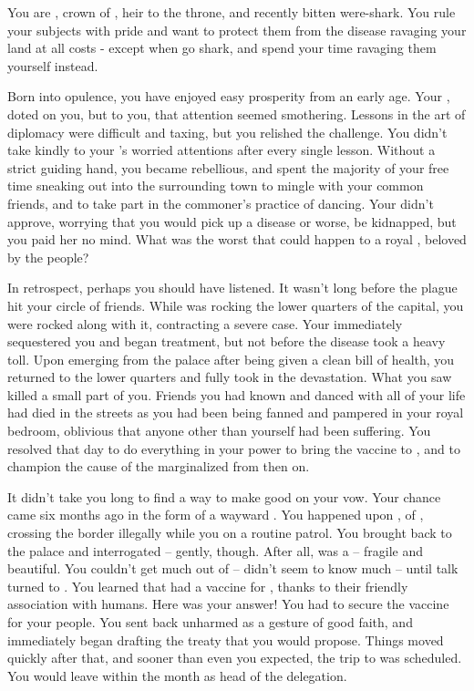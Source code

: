 \documentclass[char]{NeptuneBall}
\begin{document}
\name{\cPrince{}}

You are \cPrince{}, crown \cPrince{\prince} of \pPacifica{}, heir to the throne, and recently bitten were-shark. You rule your subjects with pride and want to protect them from the disease ravaging your land at all costs - except when go shark, and spend your time ravaging them yourself instead.

Born into opulence, you have enjoyed easy prosperity from an early age. Your \cPacificanRuler{\parent}, \cPacificanRuler{\King} \cPacificanRuler{} doted on you, but to you, that attention seemed smothering. Lessons in the art of diplomacy were difficult and taxing, but you relished the challenge. You didn't take kindly to your \cPacificanRuler{\parent}'s worried attentions after every single lesson. Without a strict guiding hand, you became rebellious, and spent the majority of your free time sneaking out into the surrounding town to mingle with your common friends, and to take part in the commoner's practice of dancing. Your \cPacificanRuler{\parent} didn't approve, worrying that you would pick up a disease or worse, be kidnapped, but you paid her no mind. What was the worst that could happen to a royal \cPrince{\prince}, beloved by the people?

In retrospect, perhaps you should have listened. It wasn't long before the plague hit your circle of friends. While \ppolio{} was rocking the lower quarters of the capital, you were rocked along with it, contracting a severe case. Your \cPacificanRuler{\parent} immediately sequestered you and began treatment, but not before the disease took a heavy toll. Upon emerging from the palace after being given a clean bill of health, you returned to the lower quarters and fully took in the devastation. What you saw killed a small part of you. Friends you had known and danced with all of your life had died in the streets as you had been being fanned and pampered in your royal bedroom, oblivious that anyone other than yourself had been suffering. You resolved that day to do everything in your power to bring the vaccine to \pPacifica{}, and to champion the cause of the marginalized from then on.

It didn't take you long to find a way to make good on your vow. Your chance came six months ago in the form of a wayward \cPrincess{\waif}. You happened upon \cPrincess{}, \cPrincess{\prince} of \pAtlantis{}, crossing the border illegally while you on a routine patrol. You brought \cPrincess{\them} back to the palace and interrogated \cPrincess{\them} -- gently, though. After all, \cPrincess{\they} was a \cPrincess{\prince} -- fragile and beautiful. You couldn't get much out of \cPrincess{\them} -- \cPrincess{\they} didn't seem to know much -- until talk turned to \ppolio{}. You learned that \pAtlantis{} had a vaccine for \ppolio{}, thanks to their friendly association with humans. Here was your answer! You had to secure the vaccine for your people.  You sent \cPrincess{} back unharmed as a gesture of good faith, and immediately began drafting the treaty that you would propose. Things moved quickly after that, and sooner than even you expected, the trip to \pAtlantis{} was scheduled. You would leave within the month as head of the delegation.
\end{document}
